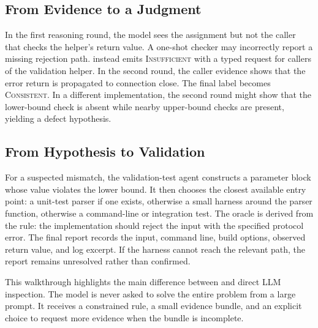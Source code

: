 \subsection{From Evidence to a Judgment}

In the first reasoning round, the model sees the assignment but not the caller
that checks the helper's return value. A one-shot checker may incorrectly report
a missing rejection path. \tool{} instead emits \textsc{Insufficient} with a
typed request for callers of the validation helper. In the second round, the
caller evidence shows that the error return is propagated to connection close.
The final label becomes \textsc{Consistent}. In a different implementation, the
second round might show that the lower-bound check is absent while nearby
upper-bound checks are present, yielding a defect hypothesis.

\subsection{From Hypothesis to Validation}

For a suspected mismatch, the validation-test agent constructs a parameter block
whose value violates the lower bound. It then chooses the closest available
entry point: a unit-test parser if one exists, otherwise a small harness around
the parser function, otherwise a command-line or integration test. The oracle is
derived from the rule: the implementation should reject the input with the
specified protocol error. The final report records the input, command line,
build options, observed return value, and log excerpt. If the harness cannot
reach the relevant path, the report remains unresolved rather than confirmed.

This walkthrough highlights the main difference between \tool{} and direct LLM
inspection. The model is never asked to solve the entire problem from a large
prompt. It receives a constrained rule, a small evidence bundle, and an explicit
choice to request more evidence when the bundle is incomplete.
